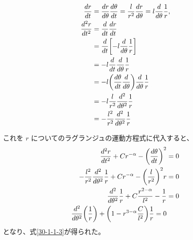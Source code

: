 \documentclass[report]{dennou777}
\begin{document}
\begin{itemize}
		\begin{align*}
			\frac{dr}{dt}&=\frac{dr}{d\theta}\frac{d\theta}{dt}
				=\frac{l}{r^2}\frac{dr}{d\theta}
				=l\frac{d}{d\theta}\frac{1}{r},\\
			\frac{d^2r}{dt^2}&=\frac{d}{dt}\frac{dr}{dt}\\
			&=\frac{d}{dt}\mleft[-l\frac{d}{d\theta}\frac{1}{r}\mright]\\
			&=-l\frac{d}{dt}\frac{d}{d\theta}\frac{1}{r}\\
			&=-l\mleft(\frac{d\theta}{dt}\frac{d}{d\theta}\mright)\frac{d}{d\theta}\frac{1}{r}\\
			&=-l\frac{l}{r^2}\frac{d^2}{d\theta^2}\frac{1}{r}\\
			&=-\frac{l^2}{r^2}\frac{d^2}{d\theta^2}\frac{1}{r}
		\end{align*}

		これを $r$ についてのラグランジュの運動方程式に代入すると、
		\begin{align*}
			\frac{d^2r}{dt^2}+Cr^{-\alpha}-\mleft(\frac{d\theta}{dt}\mright)^2&=0\\
			-\frac{l^2}{r^2}\frac{d^2}{d\theta^2}\frac{1}{r}+Cr^{-\alpha}
				-\mleft(\frac{l}{r^2}\mright)^2r&=0\\
			\frac{d^2}{d\theta^2}\frac{1}{r}+C\frac{r^{2-\alpha}}{l^2}-\frac{1}{r}&=0\\
			\frac{d^2}{d\theta^2}\mleft(\frac{1}{r}\mright)+
				\mleft(1-r^{3-\alpha}\frac{C}{l^2}\mright)\frac{1}{r}=0
		\end{align*}
		となり、式\eqref{30-1-1-3}が得られた。
\end{itemize}
\end{document}
